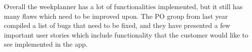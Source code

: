 Overall the weekplanner has a lot of functionalities implemented, but it still has many flaws which need to be improved upon.
The PO group from last year compiled a list of bugs that need to be fixed, and they have presented a few important user stories which include functionality that the customer would like to see implemented in the app.
